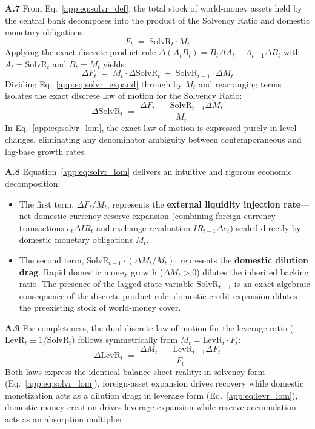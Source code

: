\textbf{A.7} From Eq.~\eqref{app:eq:solvr_def}, the total stock of world-money assets held by the central bank decomposes into the product of the Solvency Ratio and domestic monetary obligations:
\begin{equation}
	\label{app:eq:solvr_sub}
	F_t \;=\; \text{SolvR}_t \cdot M_t
\end{equation}
Applying the exact discrete product rule $\Delta(A_t B_t) = B_t \Delta A_t + A_{t-1} \Delta B_t$ with $A_t = \text{SolvR}_t$ and $B_t = M_t$ yields:
\begin{equation}
	\label{app:eq:solvr_expand}
	\Delta F_t \;=\; M_t \cdot \Delta\text{SolvR}_t \;+\; \text{SolvR}_{t-1} \cdot \Delta M_t
\end{equation}
Dividing Eq.~\eqref{app:eq:solvr_expand} through by $M_t$ and rearranging terms isolates the exact discrete law of motion for the Solvency Ratio:
\begin{equation}
	\label{app:eq:solvr_lom}
	\boxed{\;\Delta\text{SolvR}_t \;=\; \frac{\Delta F_t \;-\; \text{SolvR}_{t-1} \Delta M_t}{M_t}\;}
\end{equation}
In Eq.~\eqref{app:eq:solvr_lom}, the exact law of motion is expressed purely in level changes, eliminating any denominator ambiguity between contemporaneous and lag-base growth rates.

\textbf{A.8} Equation~\eqref{app:eq:solvr_lom} delivers an intuitive and rigorous economic decomposition:
\begin{itemize}[leftmargin=2em]
	\item The first term, $\Delta F_t / M_t$, represents the \textbf{external liquidity injection rate}---net domestic-currency reserve expansion (combining foreign-currency transactions $e_t \Delta IR_t$ and exchange revaluation $IR_{t-1} \Delta e_t$) scaled directly by domestic monetary obligations $M_t$.
	\item The second term, $\text{SolvR}_{t-1} \cdot (\Delta M_t / M_t)$, represents the \textbf{domestic dilution drag}. Rapid domestic money growth ($\Delta M_t > 0$) dilutes the inherited backing ratio. The presence of the lagged state variable $\text{SolvR}_{t-1}$ is an exact algebraic consequence of the discrete product rule: domestic credit expansion dilutes the preexisting stock of world-money cover.
\end{itemize}

\textbf{A.9} For completeness, the dual discrete law of motion for the leverage ratio ($\text{LevR}_t \equiv 1/\text{SolvR}_t$) follows symmetrically from $M_t = \text{LevR}_t \cdot F_t$:
\begin{equation}
	\label{app:eq:levr_lom}
	\Delta\text{LevR}_t \;=\; \frac{\Delta M_t \;-\; \text{LevR}_{t-1} \Delta F_t}{F_t}
\end{equation}
Both laws express the identical balance-sheet reality: in solvency form (Eq.~\ref{app:eq:solvr_lom}), foreign-asset expansion drives recovery while domestic monetization acts as a dilution drag; in leverage form (Eq.~\ref{app:eq:levr_lom}), domestic money creation drives leverage expansion while reserve accumulation acts as an absorption multiplier.

